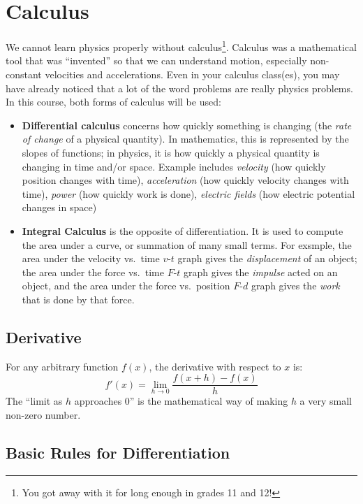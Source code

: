\documentclass{../../oss-handout}
\begin{document}
\section{Calculus}
We cannot learn physics properly without calculus\footnote{You got away with it
  for long enough in grades 11 and 12!}. Calculus was a mathematical tool that
was ``invented'' so that we can understand motion, especially non-constant
velocities and accelerations. Even in your calculus class(es), you may have
already noticed that a lot of the word problems  are really physics problems.
In this course, both forms of calculus will be used:
\begin{itemize}[nosep]
\item\textbf{Differential calculus} concerns how quickly something is changing
  (the \emph{rate of change} of a physical quantity). In mathematics, this is
  represented by the slopes of functions; in physics, it is how quickly a
  physical quantity is changing in time and/or space. Example includes
  \emph{velocity} (how quickly position changes with time), \emph{acceleration}
  (how quickly velocity changes with time), \emph{power} (how quickly work is
  done), \emph{electric fields} (how electric potential changes in space)
\item\textbf{Integral Calculus} is the opposite of differentiation. It is used
  to compute the area under a curve, or summation of many small terms. For
  exsmple, the area under the velocity vs.\ time $v$-$t$ graph gives the
  \emph{displacement} of an object; the area under the force vs.\ time
  $F$-$t$ graph gives the \emph{impulse} acted on an object, and the area
  under the force vs.\ position $F$-$d$ graph gives the \emph{work} that is
  done by that force.
\end{itemize}


\subsection{Derivative}

For any arbitrary function $f(x)$, the derivative with respect to $x$ is:
\begin{equation*}
  f'(x)=\lim_{h\rightarrow 0}\frac{f(x+h)-f(x)}{h}
\end{equation*}
The ``limit as $h$ approaches $0$'' is the mathematical way of making $h$ a
very small non-zero number.


\subsection{Basic Rules for Differentiation}
\end{document}
